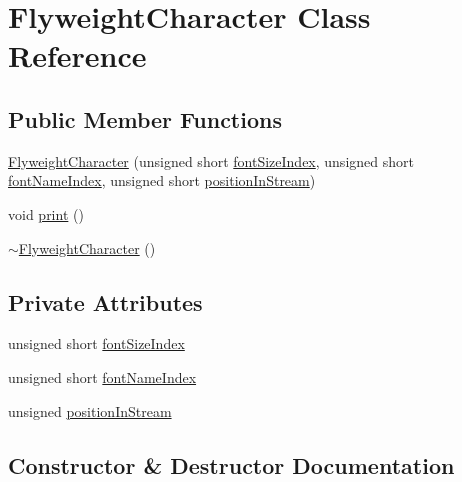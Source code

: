 \hypertarget{classFlyweightCharacter}{}\section{Flyweight\+Character Class Reference}
\label{classFlyweightCharacter}
\subsection*{Public Member Functions}
\begin{DoxyCompactItemize}
\item 
\hyperlink{classFlyweightCharacter_a6d2fea212508e56523ab4d4d7ad583d4}{Flyweight\+Character} (unsigned short \hyperlink{classFlyweightCharacter_ad2633bab3a73c5fac2b3d251bf5c2bfe}{font\+Size\+Index}, unsigned short \hyperlink{classFlyweightCharacter_ab528a214bcb91ccc0016fd0cbae331af}{font\+Name\+Index}, unsigned short \hyperlink{classFlyweightCharacter_a55c3d15287653717920c8b498d904a08}{position\+In\+Stream})
\item 
void \hyperlink{classFlyweightCharacter_abd3d3cf3508cf18403546e835280ca50}{print} ()
\item 
\hyperlink{classFlyweightCharacter_af7272d0e63182f2bd32032d09d38198d}{$\sim$\+Flyweight\+Character} ()
\end{DoxyCompactItemize}
\subsection*{Private Attributes}
\begin{DoxyCompactItemize}
\item 
unsigned short \hyperlink{classFlyweightCharacter_ad2633bab3a73c5fac2b3d251bf5c2bfe}{font\+Size\+Index}
\item 
unsigned short \hyperlink{classFlyweightCharacter_ab528a214bcb91ccc0016fd0cbae331af}{font\+Name\+Index}
\item 
unsigned \hyperlink{classFlyweightCharacter_a55c3d15287653717920c8b498d904a08}{position\+In\+Stream}
\end{DoxyCompactItemize}


\subsection{Constructor \& Destructor Documentation}
